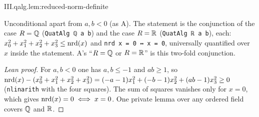 \begin{lemma}
\end{lemma}
\begin{tfformal}{III.qalg.lem:reduced-norm-definite}
\begin{tffidelity}
Unconditional apart from $a,b<0$ (as A). The statement is the conjunction of the case $R=\mathbb{Q}$ (\texttt{QuatAlg ℚ a b}) and the case $R=\mathbb{R}$ (\texttt{QuatAlg ℝ a b}), each: $x_0^2+x_1^2+x_2^2+x_3^2\le\operatorname{nrd}(x)$ and \texttt{nrd x = 0 ↔ x = 0}, universally quantified over $x$ inside the statement. A's ``$R=\mathbb{Q}$ or $R=\mathbb{R}$'' is this two-fold conjunction.
\end{tffidelity}
\end{tfformal}
\begin{proof}[Lean proof]
For $a,b<0$ one has $a,b\le-1$ and $ab\ge1$, so $\operatorname{nrd}(x)-(x_0^2+x_1^2+x_2^2+x_3^2)=(-a-1)x_1^2+(-b-1)x_2^2+(ab-1)x_3^2\ge0$ (\texttt{nlinarith} with the four squares). The sum of squares vanishes only for $x=0$, which gives $\operatorname{nrd}(x)=0\iff x=0$. One private lemma over any ordered field covers $\mathbb{Q}$ and $\mathbb{R}$.
\end{proof}


